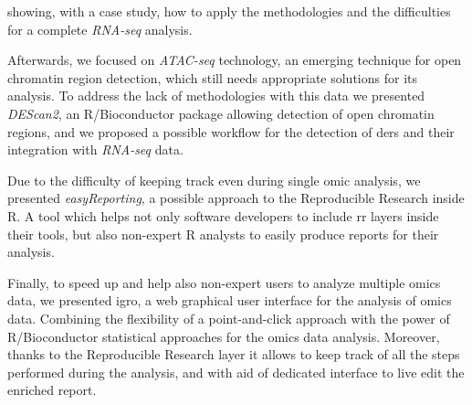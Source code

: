 showing, with a case study, how to apply the methodologies and the difficulties for a complete \textit{RNA-seq} analysis.


Afterwards, we focused on \textit{ATAC-seq} technology, an emerging technique for open chromatin region detection, which still needs appropriate solutions for its analysis.
To address the lack of methodologies with this data we presented \textit{DEScan2}, an R/Bioconductor package allowing detection of open chromatin regions, and we proposed a possible workflow for the detection of \glspl{der} and their integration with \textit{RNA-seq} data.

Due to the difficulty of keeping track even during single omic analysis, we presented \textit{easyReporting}, a possible approach to the Reproducible Research inside R.
A tool which helps not only software developers to include \gls{rr} layers inside their tools, but also non-expert R analysts to easily produce reports for their analysis.

Finally, to speed up and help also non-expert users to analyze multiple omics data, we presented \gls{igro}, a web graphical user interface for the analysis of omics data.
Combining the flexibility of a point-and-click approach with the power of R/Bioconductor statistical approaches for the omics data analysis.
Moreover, thanks to the Reproducible Research layer it allows to keep track of all the steps performed during the analysis, and with aid of dedicated interface to live edit the enriched report.